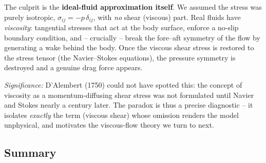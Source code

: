 \documentclass[../main.tex]{subfiles}
\begin{document}
The culprit is the \textbf{ideal-fluid approximation itself}. We assumed the stress was purely isotropic, $\sigma_{ij}=-p\,\delta_{ij}$, with \emph{no} shear (viscous) part. Real fluids have \emph{viscosity}: tangential stresses that act at the body surface, enforce a no-slip boundary condition, and -- crucially -- break the fore--aft symmetry of the flow by generating a wake behind the body. Once the viscous shear stress is restored to the stress tensor (the Navier--Stokes equations), the pressure symmetry is destroyed and a genuine drag force appears.

\textit{Significance:} D'Alembert (1750) could not have spotted this: the concept of viscosity as a momentum-diffusing shear stress was not formulated until Navier and Stokes nearly a century later. The paradox is thus a precise diagnostic -- it isolates \emph{exactly} the term (viscous shear) whose omission renders the model unphysical, and motivates the viscous-flow theory we turn to next.

\subsection*{Summary}
\end{document}
